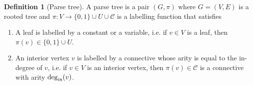 \documentclass[fleqn, a4paper, 12pt, twoside]{article}
\theoremstyle{definition}
\newtheorem{definition}{Definition}
\theoremstyle{theorem}
\begin{document}
\begin{definition}[Parse tree]
	A parse tree is a pair $(G, \pi)$ where $G = (V,E)$ is a rooted tree and $\pi : V \to \{0,1\} \cup U \cup \mathcal{C}$ is a labelling function that satisfies
	\begin{enumerate}
		\item A leaf is labelled by a constant or a variable, i.e. if $v \in V$ is a leaf, then $\pi(v) \in \{0,1\} \cup U$.
		\item An interior vertex $v$ is labelled by a connective whose arity is equal to the in-degree of $v$, i.e. if $v \in V$ is an interior vertex, then $\pi(v) \in \mathcal{C}$ is a connective with arity $\deg_{\textnormal{in}}(v)$.
	\end{enumerate}
\end{definition}
\end{document}
